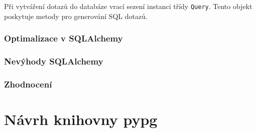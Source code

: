 \documentclass[ing,male,java,dept456]{diploma}						%
\begin{document}
Při vytváření dotazů do databáze vrací sezení instanci třídy \lstinline[style=inlinepython]|Query|. Tento objekt poskytuje metody pro generování SQL dotazů. 

\subsubsection{Optimalizace v SQLAlchemy}


\subsubsection{Nevýhody SQLAlchemy}

\subsubsection{Zhodnocení}


\section{Návrh knihovny pypg}
\label{sec:Design}
\end{document}
